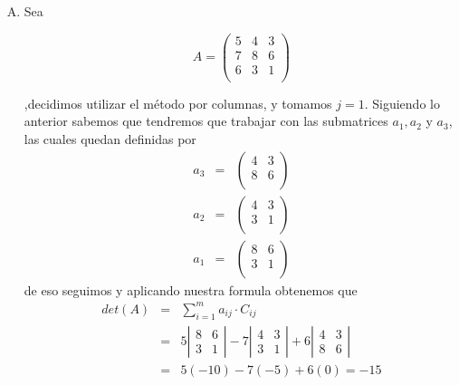 \documentclass[12pt]{article}
\begin{document}
\begin{multicols}{2}
	\begin{enumerate}[A.]
		\item Sea
		
			$$A = \begin{pmatrix}
				5 & 4 & 3\\
				7 & 8 & 6\\
				6 & 3 & 1\\
			\end{pmatrix}$$
			
		,decidimos utilizar el m\'etodo por columnas, y tomamos $j=1$. Siguiendo lo anterior sabemos que tendremos que trabajar con las submatrices $a_1, a_2$ y $a_3$, las cuales quedan definidas por
		\begin{eqnarray*}
			a_3 &=&	\begin{pmatrix}
						4 & 3\\
						8 & 6\\
					\end{pmatrix} \\
			a_2 &=&	\begin{pmatrix}
						4 & 3\\
						3 & 1\\
					\end{pmatrix} \\
			a_1 &=&	\begin{pmatrix}
						8 & 6\\
						3 & 1\\
					\end{pmatrix} 
		\end{eqnarray*}
		de eso seguimos y aplicando nuestra formula obtenemos que
		\begin{eqnarray*}
			det(A) &=& \sum_{i=1}^m a_{ij} \cdot C_{ij} \\
				&=&	 5 \left|\begin{array}{rr}
							8 & 6 \\
							3 & 1
						\end{array}\right| 
						-7 \left|\begin{array}{rr}
							4 & 3 \\
							3 & 1
						\end{array}\right| 
						+6 \left|\begin{array}{rr}
							4 & 3 \\
							8 & 6
						\end{array}\right|   \\
				&=&	 5(-10) -7(-5) +6(0) = -15 
		\end{eqnarray*}	
	

\end{enumerate}
\end{multicols}
\end{document}
